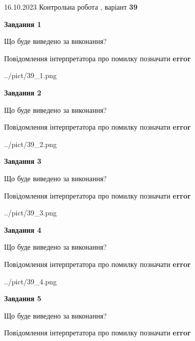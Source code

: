 \documentclass[12pt, ukrainian]{article}
\begin{document}
{\Large{16.10.2023 Контрольна робота , варіант  \No \textbf { 39 }\par}}
{
\begin {large}
{\begin {center}\textbf{Завдання 1}\end {center}}\par
Що буде виведено за виконання? \par
Повідомлення інтерпретатора про помилку позначати \textbf{error}

\begin{center}
	{../pict/39_1.png}
\end{center}
\newpage

{\begin {center}\textbf{Завдання 2}\end {center}}\par
Що буде виведено за виконання? \par
Повідомлення інтерпретатора про помилку позначати \textbf{error}

\begin{center}
	{../pict/39_2.png}
\end{center}
\newpage

{\begin {center}\textbf{Завдання 3}\end {center}}\par
Що буде виведено за виконання? \par
Повідомлення інтерпретатора про помилку позначати \textbf{error}

\begin{center}
	{../pict/39_3.png}
\end{center}
\newpage

{\begin {center}\textbf{Завдання 4}\end {center}}\par
Що буде виведено за виконання? \par
Повідомлення інтерпретатора про помилку позначати \textbf{error}

\begin{center}
	{../pict/39_4.png}
\end{center}
\newpage

{\begin {center}\textbf{Завдання 5}\end {center}}\par
Що буде виведено за виконання? \par
Повідомлення інтерпретатора про помилку позначати \textbf{error}


\end{large}}
\end{document}
